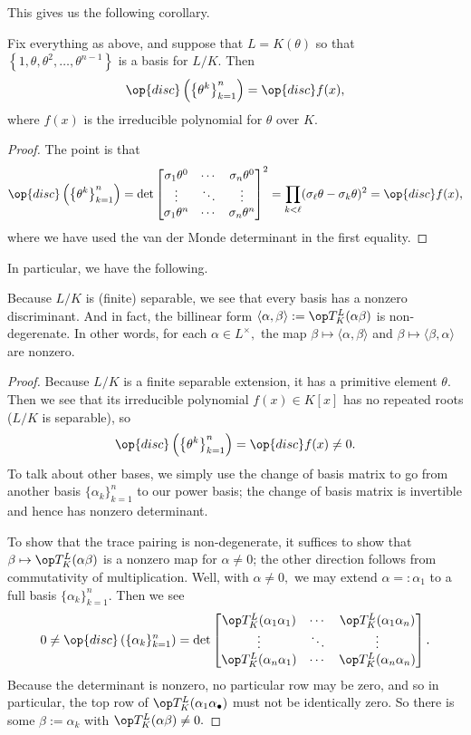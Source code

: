 \documentclass[../notes.tex]{subfiles}
\begin{document}
This gives us the following corollary.
\begin{cor}
    Fix everything as above, and suppose that $L=K(\theta)$ so that $\left\{1,\theta,\theta^2,\ldots,\theta^{n-1}\right\}$ is a basis for $L/K.$ Then
    \[\op{disc}\left(\left\{\theta^k\right\}_{k=1}^n\right)=\op{disc}f(x),\]
    where $f(x)$ is the irreducible polynomial for $\theta$ over $K.$
\end{cor}
\begin{proof}
    The point is that
    \[\op{disc}\left(\left\{\theta^k\right\}_{k=1}^n\right)=\det\begin{bmatrix}
        \sigma_1\theta^0 & \cdots & \sigma_n\theta^0 \\
        \vdots & \ddots & \vdots \\
        \sigma_1\theta^n & \cdots & \sigma_n\theta^n
    \end{bmatrix}^2=\prod_{k<\ell}(\sigma_\ell\theta-\sigma_k\theta)^2=\op{disc}f(x),\]
    where we have used the van der Monde determinant in the first equality.
\end{proof}
In particular, we have the following.
\begin{thm}
    Because $L/K$ is (finite) separable, we see that every basis has a nonzero discriminant. And in fact, the billinear form $\langle\alpha,\beta\rangle:=\op T_K^L(\alpha\beta)$ is non-degerenate. In other words, for each $\alpha\in L^\times,$ the map $\beta\mapsto\langle\alpha,\beta\rangle$ and $\beta\mapsto\langle\beta,\alpha\rangle$ are nonzero.
\end{thm}
\begin{proof}
    Because $L/K$ is a finite separable extension, it has a primitive element $\theta.$ Then we see that its irreducible polynomial $f(x)\in K[x]$ has no repeated roots ($L/K$ is separable), so
    \[\op{disc}\left(\left\{\theta^k\right\}_{k=1}^n\right)=\op{disc}f(x)\ne0.\]
    To talk about other bases, we simply use the change of basis matrix to go from another basis $\{\alpha_k\}_{k=1}^n$ to our power basis; the change of basis matrix is invertible and hence has nonzero determinant.
    
    To show that the trace pairing is non-degenerate, it suffices to show that $\beta\mapsto\op T_K^L(\alpha\beta)$ is a nonzero map for $\alpha\ne0$; the other direction follows from commutativity of multiplication. Well, with $\alpha\ne0,$ we may extend $\alpha=:\alpha_1$ to a full basis $\{\alpha_k\}_{k=1}^n.$ Then we see
    \[0\ne\op{disc}\left(\{\alpha_k\}_{k=1}^n\right)=\det\begin{bmatrix}
        \op T_K^L(\alpha_1\alpha_1) & \cdots & \op T_K^L(\alpha_1\alpha_n) \\
        \vdots & \ddots & \vdots \\
        \op T_K^L(\alpha_n\alpha_1) & \cdots & \op T_K^L(\alpha_n\alpha_n)
    \end{bmatrix}.\]
    Because the determinant is nonzero, no particular row may be zero, and so in particular, the top row of $\op T_K^L(\alpha_1\alpha_\bullet)$ must not be identically zero. So there is some $\beta:=\alpha_k$ with $\op T_K^L(\alpha\beta)\ne0.$
\end{proof}
\end{document}
